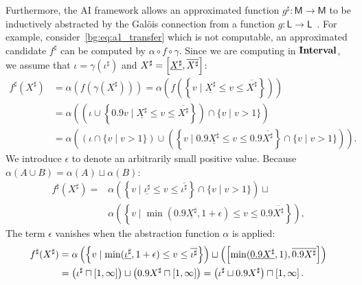 Furthermore, the AI framework allows an approximated function $g^\sharp:
\mathsf{M} \to \mathsf{M}$ to be inductively abstracted by the Gal\"ois
connection from a function $g: \mathsf{L} \to \mathsf{L}$~\cite{nielson99}.
For example, consider~\eqref{bg:eq:a1_transfer} which is not computable,
an approximated candidate $f^\sharp$ can be computed by $\alpha
\circ f \circ \gamma$.  Since we are computing in $\mathbf{Interval}$,
we assume that $\iota = \gamma(\iota^\sharp)$ and $X^\sharp =
\left[{\underline{X^\sharp}}, {\overline{X^\sharp}}\right]$:
\begin{equation}
    \begin{aligned}
        f^\sharp(X^\sharp)
        &= \alpha \left( f \left(
            \gamma \left( X^\sharp \right)
        \right) \right)
        = \alpha \left( f \left( \left\{
            v \mid \underline{X^\sharp} \leq v \leq \overline{X^\sharp}
        \right\} \right) \right) \\
        &= \alpha \left(
        \left(
            \iota \cup
            \left\{
                0.9 v \mid
                \underline{X^\sharp} \leq v \leq \overline{X^\sharp}
            \right\}
        \right) \cap \{ v \mid v > 1 \} \right) \\
        &= \alpha \left(
            \left( \iota \cap \{ v \mid v > 1 \} \right) \cup
            \left( \left\{
                v \mid
                0.9 \underline{X^\sharp} \leq v \leq 0.9 \overline{X^\sharp}
            \right\} \cap \{ v \mid v > 1 \} \right)
        \right).
    \end{aligned}
\end{equation}
We introduce $\epsilon$ to denote an arbitrarily small positive value.  Because
$\alpha(A \cup B) = \alpha(A) \sqcup \alpha(B)$:
\begin{equation}
    \begin{aligned}
        f^\sharp(X^\sharp)
        ={} & \alpha \left( \left\{
            v \mid \underline{\iota^\sharp}
                \leq v \leq \overline{\iota^\sharp}
        \right\} \cap \{ v \mid v > 1 \} \right) \sqcup \\
        &
        \alpha \left( \left\{
            v \mid
            \min(0.9 \underline{X^\sharp}, 1 + \epsilon)
                \leq v \leq 0.9 \overline{X^\sharp}
        \right\} \right),
    \end{aligned}
\end{equation}
The term $\epsilon$ vanishes when the abstraction function $\alpha$ is applied:
\begin{equation}
    \begin{aligned}
        f^\sharp(X^\sharp)
        &= \alpha \left( \left\{
            v \mid
            \min(\underline{\iota^\sharp}, 1 + \epsilon)
                \leq v \leq \overline{\iota^\sharp}
        \right\} \right) \sqcup
        \left( \left[{
            \min(\underline{0.9X^\sharp}, 1)
        }, {\overline{0.9X^\sharp}}\right] \right) \\
        &= \left( \iota^\sharp \sqcap \left[{1}, {\infty}\right] \right) \sqcup
           \left( 0.9 X^\sharp \sqcap \left[{1}, {\infty}\right] \right)
         = \left( \iota^\sharp \sqcup 0.9 X^\sharp \right) \sqcap
           \left[{1}, {\infty}\right].
    \end{aligned}
\end{equation}

